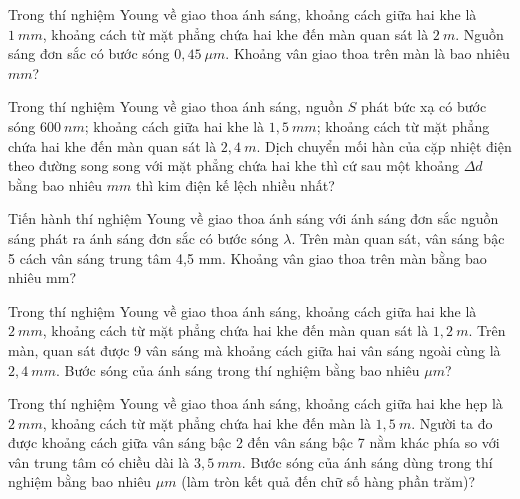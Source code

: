 \setcounter{paragraph}{0}
\setcounter{ex}{0}
\PhanIII
\begin{ex}
Trong thí nghiệm Young về giao thoa ánh sáng, khoảng cách giữa hai khe là $1 \ mm$, khoảng cách từ mặt phẳng chứa hai khe đến màn quan sát là $2 \ m$. Nguồn sáng đơn sắc có bước sóng $0,45\ \mu m$. Khoảng vân giao thoa trên màn là bao nhiêu $mm$?
\end{ex} 
\begin{ex}
Trong thí nghiệm Young về giao thoa ánh sáng, nguồn $S$ phát bức xạ có bước sóng $600 \ nm$; khoảng cách giữa hai khe là $1,5 \ mm$; khoảng cách từ mặt phẳng chứa hai khe đến màn quan sát là $2,4 \ m$. Dịch chuyển mối hàn của cặp nhiệt điện theo đường song song với mặt phẳng chứa hai khe thì cứ sau một khoảng $\Delta d$ bằng bao nhiêu $mm$ thì kim điện kế lệch nhiều nhất?
\end{ex} 
\begin{ex}
Tiến hành thí nghiệm Young về giao thoa ánh sáng với ánh sáng đơn sắc nguồn sáng phát ra ánh sáng đơn sắc có bước sóng $\lambda$. Trên màn quan sát, vân sáng bậc 5 cách vân sáng trung tâm 4,5 mm. Khoảng vân giao thoa trên màn bằng bao nhiêu mm?
\end{ex} 
\begin{ex}
Trong thí nghiệm Young về giao thoa ánh sáng, khoảng cách giữa hai khe là $2 \ mm$, khoảng cách từ mặt phẳng chứa hai khe đến màn quan sát là $1,2 \ m$. Trên màn, quan sát được 9 vân sáng mà khoảng cách giữa hai vân sáng ngoài cùng là $2,4 \ mm$. Bước sóng của ánh sáng trong thí nghiệm bằng bao nhiêu $\mu m$?
\end{ex} 
\begin{ex}
Trong thí nghiệm Young về giao thoa ánh sáng, khoảng cách giữa hai khe hẹp là $2 \ mm$, khoảng cách từ mặt phẳng chứa hai khe đến màn là $1,5 \ m$. Người ta đo được khoảng cách giữa vân sáng bậc 2 đến vân sáng bậc 7 nằm khác phía so với vân trung tâm có chiều dài là $3,5 \ mm$. Bước sóng của ánh sáng dùng trong thí nghiệm bằng bao nhiêu $\mu m$ (làm tròn kết quả đến chữ số hàng phần trăm)?
\end{ex} 
